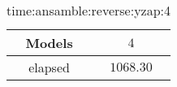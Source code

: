 \begin{table}[!ht]
	\centering
	\begin{tabular}{|c|c|}
		\hline
		Models & $4$ \\ \hline
		elapsed & $1068.30$ \\ \hline
	\end{tabular}
	\caption{time:ansamble:reverse:yzap:4}
	\label{tab:time:ansamble:reverse:yzap:4}
\end{table}
